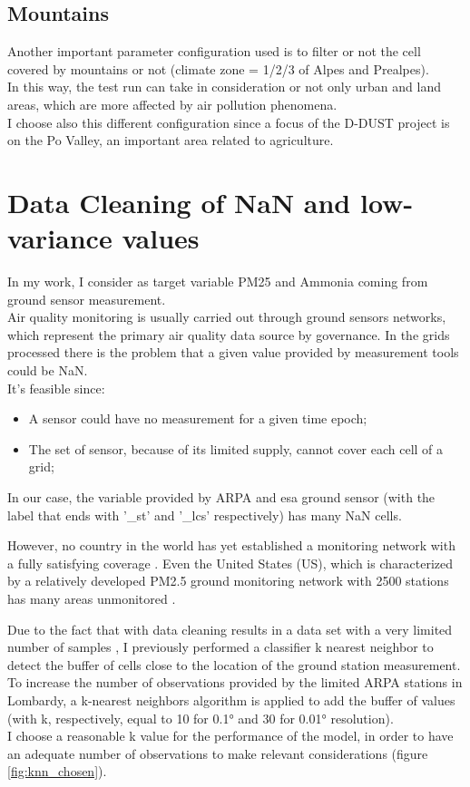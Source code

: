 \subsection{Mountains}
Another important parameter configuration used is to filter or not the cell covered by mountains or not (climate zone = 1/2/3 of Alpes and Prealpes). \\ 
In this way, the test run can take in consideration or not only urban and land areas, which are more affected by air pollution phenomena.\\
I choose also this different configuration since a focus of the D-DUST project is on the Po Valley, an important area related to agriculture.
\section{Data Cleaning of NaN and low-variance values }
\label{subsec:nan}
In my work, I consider as target variable PM25 and Ammonia coming from ground sensor measurement.\\
Air quality monitoring is usually carried out through ground sensors networks, which represent the primary air quality data source by governance. \newline
In the grids processed there is the problem that a given value provided by measurement tools could be NaN. \\
It's feasible since:
\begin{itemize}
\item A sensor could have no measurement for a given time epoch;
\item The set of sensor, because of its limited supply, cannot cover each cell of a grid;
\end{itemize}
In our case, the variable provided by ARPA and \acrshort{esa} ground sensor (with the label that ends with '\_st' and '\_lcs' respectively) has many NaN cells.
\par
However, no country in the world has yet established a monitoring network with a fully satisfying coverage \cite{liu2018improve}. Even the United States (US), which is characterized by a relatively developed PM2.5 ground monitoring network with 2500 stations has many areas unmonitored \cite{liu2018improve}. \par
Due to the fact that with data cleaning results in a data set with a very limited number of samples \cite{zhang2018strategy}, I previously performed a classifier k nearest neighbor  \cite{taunk2019brief} to detect the buffer of cells close to the location of the ground station measurement.\\
To increase the number of observations provided by the limited ARPA stations in Lombardy, a k-nearest neighbors algorithm is applied to add the buffer of values (with k, respectively, equal to 10 for 0.1° and 30 for 0.01° resolution). \\ 
I choose a reasonable k value for the performance of the model, in order to have an adequate number of observations to make relevant considerations (figure \ref{fig:knn_chosen}).

